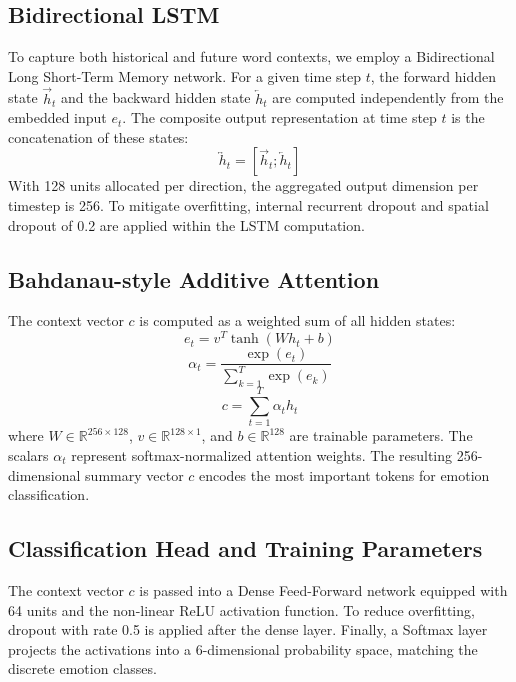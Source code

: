 \documentclass[conference]{IEEEtran}
\begin{document}
\subsection{Bidirectional LSTM}
To capture both historical and future word contexts, we employ a Bidirectional Long Short-Term Memory network. For a given time step $t$, the forward hidden state $\overrightarrow{h}_t$ and the backward hidden state $\overleftarrow{h}_t$ are computed independently from the embedded input $e_t$. The composite output representation at time step $t$ is the concatenation of these states:
\begin{equation}
\overleftrightarrow{h}_t = [\overrightarrow{h}_t; \overleftarrow{h}_t]
\end{equation}
With 128 units allocated per direction, the aggregated output dimension per timestep is 256. To mitigate overfitting, internal recurrent dropout and spatial dropout of 0.2 are applied within the LSTM computation.

\subsection{Bahdanau-style Additive Attention}
The context vector $c$ is computed as a weighted sum of all hidden states:
\begin{equation}
e_t = v^T \tanh(W h_t + b)
\end{equation}
\begin{equation}
\alpha_t = \frac{\exp(e_t)}{\sum_{k=1}^T \exp(e_k)}
\end{equation}
\begin{equation}
c = \sum_{t=1}^T \alpha_t h_t
\end{equation}
where $W \in \mathbb{R}^{256 \times 128}$, $v \in \mathbb{R}^{128 \times 1}$, and $b \in \mathbb{R}^{128}$ are trainable parameters. The scalars $\alpha_t$ represent softmax-normalized attention weights. The resulting 256-dimensional summary vector $c$ encodes the most important tokens for emotion classification.

\subsection{Classification Head and Training Parameters}
The context vector $c$ is passed into a Dense Feed-Forward network equipped with 64 units and the non-linear ReLU activation function. To reduce overfitting, dropout with rate 0.5 is applied after the dense layer. Finally, a Softmax layer projects the activations into a 6-dimensional probability space, matching the discrete emotion classes.
\end{document}
